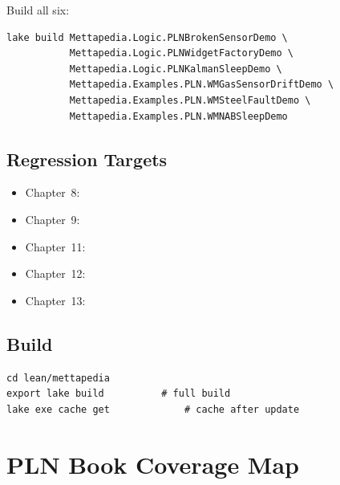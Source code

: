 \documentclass[11pt,openany]{report}
\begin{document}
\noindent
Build all six:
\begin{lstlisting}
lake build Mettapedia.Logic.PLNBrokenSensorDemo \
           Mettapedia.Logic.PLNWidgetFactoryDemo \
           Mettapedia.Logic.PLNKalmanSleepDemo \
           Mettapedia.Examples.PLN.WMGasSensorDriftDemo \
           Mettapedia.Examples.PLN.WMSteelFaultDemo \
           Mettapedia.Examples.PLN.WMNABSleepDemo
\end{lstlisting}

\section{Regression Targets}

\begin{itemize}
\item Chapter~8: 
\item Chapter~9: 
\item Chapter~11: 
\item Chapter~12: 
\item Chapter~13: 
\end{itemize}

\section{Build}

\begin{lstlisting}
cd lean/mettapedia
export lake build          # full build
lake exe cache get             # cache after update
\end{lstlisting}


\chapter{PLN Book Coverage Map}
\label{app:coverage-map}
\end{document}
